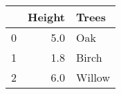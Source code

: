 \begin{tabular}{lrl}
\hline
{} &  Height &   Trees \\
\hline
0 &     5.0 &     Oak \\
1 &     1.8 &   Birch \\
2 &     6.0 &  Willow \\
\hline
\end{tabular}